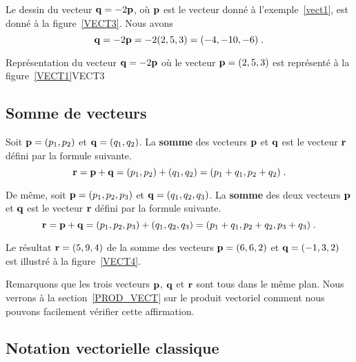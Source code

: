 {\begin{egg}
Le dessin du vecteur $\displaystyle \mathbf{q} = -2 \mathbf{p}$, où
$\mathbf{p}$ est le vecteur donné à l'exemple~\ref{vect1}, est donné à la
figure~\ref{VECT3}.  Nous avons
\[
\mathbf{q} = -2 \mathbf{p} = -2 (2, 5, 3) = (-4,-10,-6) \; .
\]
\end{egg}

{Représentation du vecteur $\mathbf{q} = -2\mathbf{p}$ où le vecteur
$\mathbf{p}=(2,5,3)$ est représenté à la figure~\ref{VECT1}}{VECT3}

\subsection{Somme de vecteurs}

\begin{focus}{\dfn} 
Soit $\mathbf{p} = (p_1,p_2)$ et $\mathbf{q} = (q_1, q_2)$.  La
{\bfseries somme} des vecteurs $\mathbf{p}$ et $\mathbf{q}$ est le
vecteur $\mathbf{r}$ défini par la formule suivante.
\[
\mathbf{r} = \mathbf{p} + \mathbf{q} = ( p_1, p_2) + (q_1, q_2)
= (p_1+q_1, p_2+q_2) \; .
\]

De même, soit $\mathbf{p} = (p_1,p_2,p_3)$ et $\mathbf{q} = (q_1, q_2, q_3)$.
La {\bfseries somme} des deux vecteurs $\mathbf{p}$ et
$\mathbf{q}$ est le vecteur $\mathbf{r}$ défini par la formule suivante.
\[
\mathbf{r} = \mathbf{p} + \mathbf{q} = ( p_1, p_2, p_3) + (q_1, q_2, q_3)
= (p_1+q_1, p_2+q_2, p_3+q_3) \; .
\]
\end{focus}

\begin{egg}
Le résultat $\mathbf{r} = (5,9,4)$ de la somme des vecteurs $\mathbf{p} = (6,6,2)$
et $\mathbf{q} = (-1, 3, 2)$ est illustré à la figure~\ref{VECT4}.

Remarquons que les trois vecteurs $\mathbf{p}$, $\mathbf{q}$ et $\mathbf{r}$ sont
tous dans le même plan.  Nous verrons à la section~\ref{PROD_VECT} sur
le produit vectoriel comment nous pouvons facilement vérifier cette
affirmation.
\label{EX_SUM}
\end{egg}


\subsection{Notation vectorielle classique}

}
